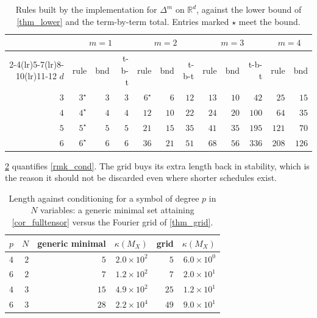 \documentclass[final]{siamltex}
\newcommand{\R}{\mathbb{R}}
\begin{document}
\begin{table}[t]
\caption{Rules built by the implementation for $\Delta^{m}$ on $\R^{d}$, against
the lower bound of \cref{thm_lower} and the term-by-term total.  Entries marked
$\star$ meet the bound.}
\label{tab_implemented}
\centering
\begin{tabular}{rrrrrrrrrrrr}
\toprule
& \multicolumn{3}{c}{$m=1$} & \multicolumn{3}{c}{$m=2$}
& \multicolumn{3}{c}{$m=3$} & \multicolumn{2}{c}{$m=4$} \\
\cmidrule(lr){2-4}\cmidrule(lr){5-7}\cmidrule(lr){8-10}\cmidrule(lr){11-12}
$d$ & rule & bnd & t-b-t & rule & bnd & t-b-t & rule & bnd & t-b-t & rule & bnd \\
\midrule
$3$ & $3^{\star}$ & $3$ & $3$   & $6^{\star}$ & $6$  & $12$ & $13$ & $10$ & $42$  & $25$  & $15$ \\
$4$ & $4^{\star}$ & $4$ & $4$   & $12$ & $10$ & $22$ & $24$ & $20$ & $100$ & $64$  & $35$ \\
$5$ & $5^{\star}$ & $5$ & $5$   & $21$ & $15$ & $35$ & $41$ & $35$ & $195$ & $121$ & $70$ \\
$6$ & $6^{\star}$ & $6$ & $6$   & $36$ & $21$ & $51$ & $68$ & $56$ & $336$ & $208$ & $126$ \\
\bottomrule
\end{tabular}
\end{table}

\cref{tab_cond} quantifies \cref{rmk_cond}.  The grid buys its extra length back
in stability, which is the reason it should not be discarded even where shorter
schedules exist.

\begin{table}[t]
\caption{Length against conditioning for a symbol of degree $p$ in $N$
variables: a generic minimal set attaining \cref{cor_fulltensor} versus the
Fourier grid of \cref{thm_grid}.}
\label{tab_cond}
\centering
\begin{tabular}{rrrrrr}
\toprule
$p$ & $N$ & generic minimal & $\kappa(M_{X})$ & grid & $\kappa(M_{X})$ \\
\midrule
$4$ & $2$ & $5$  & $2.0\times10^{2}$ & $5$  & $6.0\times10^{0}$ \\
$6$ & $2$ & $7$  & $1.2\times10^{2}$ & $7$  & $2.0\times10^{1}$ \\
$4$ & $3$ & $15$ & $4.9\times10^{2}$ & $25$ & $1.2\times10^{1}$ \\
$6$ & $3$ & $28$ & $2.2\times10^{4}$ & $49$ & $9.0\times10^{1}$ \\
\bottomrule
\end{tabular}
\end{table}
\end{document}
